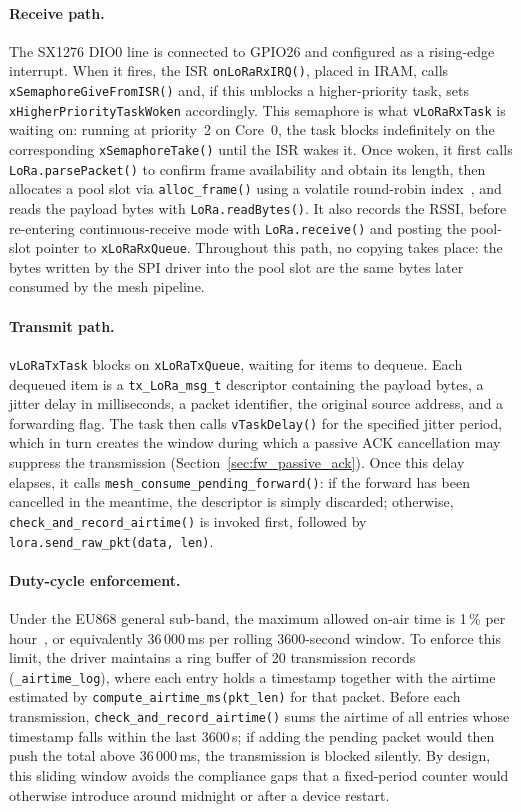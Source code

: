 \documentclass[english,bachelor]{tfgitic}[2026/01/22]
\begin{document}
\paragraph{Receive path.}
The SX1276 DIO0 line is connected to GPIO26 and configured as a rising-edge
interrupt. When it fires, the ISR \texttt{onLoRaRxIRQ()}, placed in IRAM, calls
\texttt{xSemaphoreGiveFromISR()} and, if this unblocks a higher-priority task,
sets \texttt{xHigherPriorityTaskWoken} accordingly. This semaphore is what
\texttt{vLoRaRxTask} is waiting on: running at priority~2 on Core~0, the task
blocks indefinitely on the corresponding \texttt{xSemaphoreTake()} until the ISR
wakes it. Once woken, it first calls \texttt{LoRa.parsePacket()} to confirm frame
availability and obtain its length, then allocates a pool slot via
\texttt{alloc\_frame()} using a volatile round-robin index~\cite[Ch.~2]{tanenbaum2015modern}, and reads the payload
bytes with \texttt{LoRa.readBytes()}. It also records the RSSI,
before re-entering continuous-receive mode with \texttt{LoRa.receive()} and
posting the pool-slot pointer to \texttt{xLoRaRxQueue}. Throughout this
path, no copying takes place: the bytes written by the SPI driver into the pool
slot are the same bytes later consumed by the mesh pipeline.

\paragraph{Transmit path.}
\texttt{vLoRaTxTask} blocks on \texttt{xLoRaTxQueue}, waiting for items to dequeue.
Each dequeued item is a \texttt{tx\_LoRa\_msg\_t} descriptor containing the payload
bytes, a jitter delay in milliseconds, a packet identifier, the original source
address, and a forwarding flag. The task then calls \texttt{vTaskDelay()} for the
specified jitter period, which in turn creates the window during which a passive
ACK cancellation may suppress the transmission (Section~\ref{sec:fw_passive_ack}).
Once this delay elapses, it calls \texttt{mesh\_consume\_pending\_forward()}: if the
forward has been cancelled in the meantime, the descriptor is simply discarded;
otherwise, \texttt{check\_and\_record\_airtime()} is invoked first, followed by
\texttt{lora.send\_raw\_pkt(data,\,len)}.

\paragraph{Duty-cycle enforcement.}
Under the EU868 general sub-band, the maximum allowed on-air time is 1\,\% per
hour~\cite{etsi2020en300220}, or equivalently 36\,000\,ms per rolling 3600-second
window. To enforce this limit, the driver maintains a ring buffer of 20
transmission records (\texttt{\_airtime\_log}), where each entry holds a timestamp
together with the airtime estimated by \texttt{compute\_airtime\_ms(pkt\_len)} for
that packet. Before each transmission, \texttt{check\_and\_record\_airtime()} sums
the airtime of all entries whose timestamp falls within the last 3600\,s; if adding
the pending packet would then push the total above 36\,000\,ms, the transmission is
blocked silently. By design, this sliding window avoids the compliance gaps that a
fixed-period counter would otherwise introduce around midnight or after a device
restart.
\end{document}
